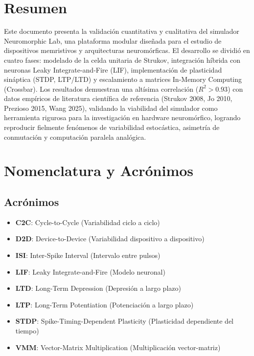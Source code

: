 \chapter*{Resumen}
Este documento presenta la validación cuantitativa y cualitativa del simulador Neuromorphic Lab, una plataforma modular diseñada para el estudio de dispositivos memristivos y arquitecturas neuromórficas. El desarrollo se dividió en cuatro fases: modelado de la celda unitaria de Strukov, integración híbrida con neuronas Leaky Integrate-and-Fire (LIF), implementación de plasticidad sináptica (STDP, LTP/LTD) y escalamiento a matrices In-Memory Computing (Crossbar). Los resultados demuestran una altísima correlación ($R^2 > 0.93$) con datos empíricos de literatura científica de referencia (Strukov 2008, Jo 2010, Prezioso 2015, Wang 2025), validando la viabilidad del simulador como herramienta rigurosa para la investigación en hardware neuromórfico, logrando reproducir fielmente fenómenos de variabilidad estocástica, asimetría de conmutación y computación paralela analógica.

\chapter*{Nomenclatura y Acrónimos}
\section*{Acrónimos}
\begin{itemize}
    \item \textbf{C2C}: Cycle-to-Cycle (Variabilidad ciclo a ciclo)
    \item \textbf{D2D}: Device-to-Device (Variabilidad dispositivo a dispositivo)
    \item \textbf{ISI}: Inter-Spike Interval (Intervalo entre pulsos)
    \item \textbf{LIF}: Leaky Integrate-and-Fire (Modelo neuronal)
    \item \textbf{LTD}: Long-Term Depression (Depresión a largo plazo)
    \item \textbf{LTP}: Long-Term Potentiation (Potenciación a largo plazo)
    \item \textbf{STDP}: Spike-Timing-Dependent Plasticity (Plasticidad dependiente del tiempo)
    \item \textbf{VMM}: Vector-Matrix Multiplication (Multiplicación vector-matriz)
\end{itemize}


